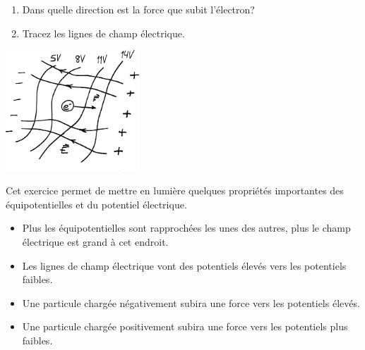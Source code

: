 \begin{enumerate}
  \item Dans quelle direction est la force que subit l'électron?
  \item Tracez les lignes de champ électrique.
\end{enumerate}


\begin{center}
  \includegraphics[width=5cm]{04-potentiel/figures/exercice-equipotentielles-solution.pdf}
\end{center}



Cet exercice permet de mettre en lumière quelques propriétés importantes des
équipotentielles et du potentiel électrique.

\begin{itemize}
  \item Plus les équipotentielles sont rapprochées les unes des autres, plus le
    champ électrique est grand à cet endroit.
  \item Les lignes de champ électrique vont des potentiels élevés vers les
    potentiels faibles.
  \item Une particule chargée négativement subira une force vers les potentiels
    élevés.
  \item Une particule chargée positivement subira une force vers les potentiels
    plus faibles.
\end{itemize}

